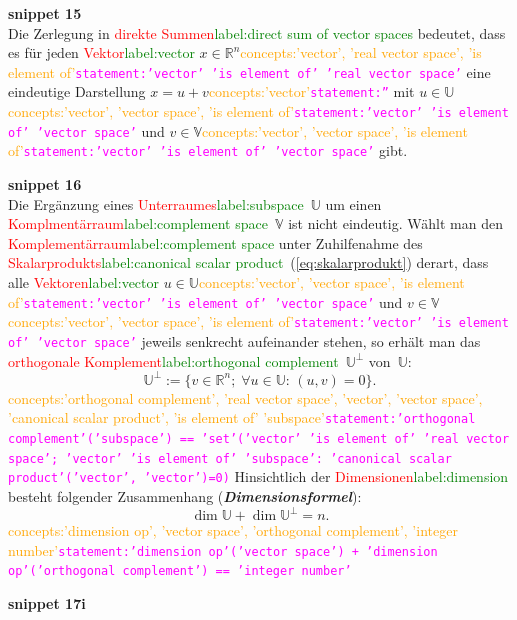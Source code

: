 \documentclass[a4paper,twoside,english,ngerman,deutsch,german,sectrefs,envcountsame,envcountchap]{svmono}
\newcommand{\setref}[2]{\textcolor{red}{#1}\textcolor{green}{#2}}
\newcommand{\snippet}[1]{\textbf{snippet #1}\\}
\newcommand{\eqnote}[2]{\textcolor{orange}{#1}\textcolor{magenta}{\texttt{#2}}}
\begin{document}
\snippet{15}
Die Zerlegung in \setref{direkte Summen}{label:direct sum of vector spaces} bedeutet, dass es für jeden \setref{Vektor}{label:vector} $x\in{\mathbb{R}}^{n}$\eqnote{concepts:'vector', 'real vector space', 'is element of'}{statement:'vector' 'is element of' 'real vector space'} eine eindeutige Darstellung $x=u+v$\eqnote{concepts:'vector'}{statement:''} mit $u\in\mathbb{U}$\eqnote{concepts:'vector', 'vector space', 'is element of'}{statement:'vector' 'is element of' 'vector space'} und $v\in\mathbb{V}$\eqnote{concepts:'vector', 'vector space', 'is element of'}{statement:'vector' 'is element of' 'vector space'} gibt.

\snippet{16}
Die Ergänzung eines \setref{Unterraumes}{label:subspace}~$\mathbb{U}$ um einen \setref{Komplmentärraum}{label:complement space}~$\mathbb{V}$ ist nicht eindeutig. Wählt man den \setref{Komplementärraum}{label:complement space} unter Zuhilfenahme des \setref{Skalarprodukts}{label:canonical scalar product}~(\eqref{eq:skalarprodukt}) derart, dass alle \setref{Vektoren}{label:vector} $u\in\mathbb{U}$\eqnote{concepts:'vector', 'vector space', 'is element of'}{statement:'vector' 'is element of' 'vector space'} und $v\in\mathbb{V}$\eqnote{concepts:'vector', 'vector space', 'is element of'}{statement:'vector' 'is element of' 'vector space'} jeweils senkrecht aufeinander stehen, so erhält man das \setref{orthogonale Komplement}{label:orthogonal complement}~$\mathbb{U}^{\perp}$ von~$\mathbb{U}$:
\begin{equation}
\mathbb{U}^{\perp}:=\{v\in{\mathbb{R}}^{n};\;\forall u\in\mathbb{U}:\,(u,v)=0\}.\label{eq:ortho-komplement}
\end{equation}\eqnote{concepts:'orthogonal complement', 'real vector space', 'vector', 'vector space', 'canonical scalar product', 'is element of' 'subspace'}{statement:'orthogonal complement'('subspace') == 'set'('vector' 'is element of' 'real vector space'; 'vector' 'is element of' 'subspace': 'canonical scalar product'('vector', 'vector')=0)}
Hinsichtlich der \setref{Dimensionen}{label:dimension} besteht folgender Zusammenhang (\textbf{\em Dimensionsformel}):
\begin{equation}
\dim\mathbb{U}+\dim\mathbb{U}^{\perp}=n.\label{eq:dimensionsformel-ortho-kompl}
\end{equation}\eqnote{concepts:'dimension op', 'vector space', 'orthogonal complement', 'integer number'}{statement:'dimension op'('vector space') + 'dimension op'('orthogonal complement') == 'integer number'}

\snippet{17i}
\end{document}
